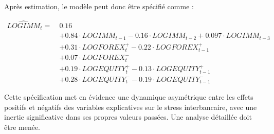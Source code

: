 Après estimation, le modèle peut donc être spécifié comme : 

\begin{align*}
\widehat{LOGIMM}_t =\ & 0.16 \\
& + 0.84 \cdot LOGIMM_{t-1} - 0.16 \cdot LOGIMM_{t-2} + 0.097 \cdot LOGIMM_{t-3} \\
& + 0.31 \cdot LOGFOREX^{+}_t - 0.22 \cdot LOGFOREX^{+}_{t-1} \\
& + 0.07 \cdot LOGFOREX^{-}_t \\
& + 0.19 \cdot LOGEQUITY^{+}_t - 0.13 \cdot LOGEQUITY^{+}_{t-1} \\
& + 0.28 \cdot LOGEQUITY^{-}_t - 0.19 \cdot LOGEQUITY^{-}_{t-1}
\end{align*}

Cette spécification met en évidence une dynamique asymétrique entre les effets positifs et négatifs des variables explicatives sur le stress interbancaire, avec une inertie significative dans ses propres valeurs passées. Une analyse détaillée doit être menée.


